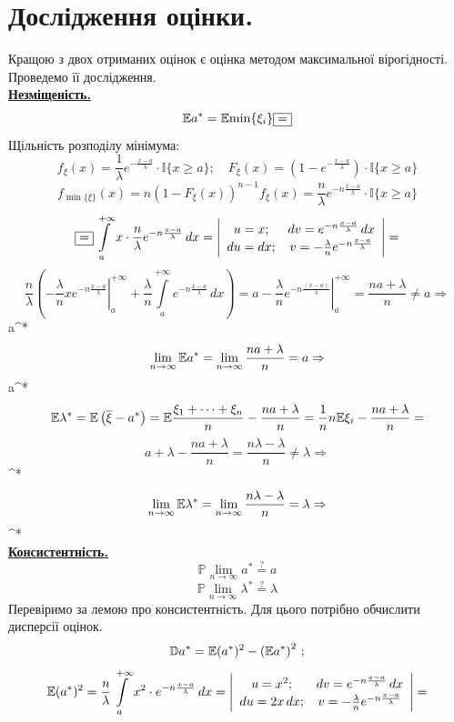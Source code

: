 \documentclass[14pt,a4paper]{scrartcl}
\begin{document}
\newpage
\section{Дослідження оцінки.}

Кращою з двох отриманих оцінок є оцінка методом максимальної вірогідності. Проведемо її дослідження.\\
\underline{\textbf{Незміщеність.}}\\
$$\mathbb{E} {a^*}=\mathbb{E} {\min\{\xi_i\}}\fbox{$=$}$$
Щільність розподілу мінімума:
$$f_\xi(x)=\frac1\lambda e^{-\frac{x-a}\lambda}\cdot\mathbb{I}\{x\geq a\};\quad
F_\xi(x)=(1-e^{-\frac{x-a}\lambda})\cdot\mathbb{I}\{x\geq a\}$$
$$f_{\min\{\xi\}}(x)=n(1-F_\xi(x))^{n-1}f_\xi(x)=
\frac{n}\lambda e^{-n\frac{x-a}{\lambda}}\cdot\mathbb{I}\{x\geq a\}$$
$$\fbox{$=$}\int\limits_{a}^{+\infty}{x\cdot\frac{n}\lambda e^{-n\frac{x-a}{\lambda}}\,dx}=
\left|\begin{array}{cc}
  u=x; & dv=e^{-n\frac{x-a}{\lambda}}\,dx\\
  du=dx; & v=-\frac{\lambda}{n}e^{-n\frac{x-a}{\lambda}}
\end{array}\right|=$$
$$\frac{n}{\lambda}\left(\left.-\frac{\lambda}{n}xe^{-n\frac{x-a}{\lambda}}\right|_a^{+\infty}+\frac{\lambda}{n}\int\limits_{a}^{+\infty}{e^{-n\frac{x-a}{\lambda}}\,dx}\right)=
a-\left.\frac{\lambda}{n}e^{-n\frac{(x-a)}{\lambda}}\right|_a^{+\infty}=
\frac{na+\lambda}n\ne a\Rightarrow$$
\be\Rightarrow a^*\ee
$$\lim\limits_{n\to\infty}{\mathbb{E} a^*}=\lim\limits_{n\to\infty}{\frac{na+\lambda}n}=a\Rightarrow$$
\be\Rightarrow a^*\ee
\\
$$\mathbb{E} \lambda^*=\mathbb{E} \left(\overline{\xi}-a^*\right)=
\mathbb{E} \frac{\xi_1+\dots+\xi_n}n-\frac{na+\lambda}n=
\frac1nn\mathbb{E} \xi_i-\frac{na+\lambda}n=$$
$$a+\lambda-\frac{na+\lambda}n=\frac{n\lambda-\lambda}n\ne\lambda\Rightarrow$$
\be\Rightarrow\lambda^*\ee
$$\lim\limits_{n\to\infty}{\mathbb{E} \lambda^*}=\lim\limits_{n\to\infty}{\frac{n\lambda-\lambda}n}=\lambda\Rightarrow$$
\be\Rightarrow\lambda^*\ee
\newpage\\
\underline{\textbf{Консистентність.}}
$$\mathbb{P}\lim\limits_{n\to\infty}{a^*}\stackrel{?}{=}a$$
$$\mathbb{P}\lim\limits_{n\to\infty}{\lambda^*}\stackrel{?}{=}\lambda$$
Перевіримо за лемою про консистентність. Для цього потрібно обчислити дисперсії оцінок.
$$\mathbb{D} a^*=\mathbb{E} (a^*)^2-\left(\mathbb{E} a^*\right)^2\,;$$
$$\mathbb{E} (a^*)^2=\frac{n}\lambda\int\limits_{a}^{+\infty}{x^2\cdot e^{-n\frac{x-a}\lambda}\,dx}=
\left|\begin{array}{cc}
  u=x^2; & dv=e^{-n\frac{x-a}\lambda}\,dx\\
  du=2x\,dx; & v=-\frac\lambda{n}e^{-n\frac{x-a}\lambda}
\end{array}\right|=$$
\end{document}
